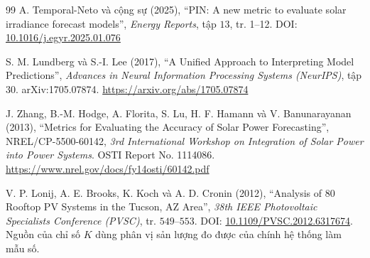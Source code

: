 \begin{thebibliography}{99}
A. Temporal-Neto và cộng sự (2025),
``PIN: A new metric to evaluate solar irradiance forecast models'',
\textit{Energy Reports}, tập $13$, tr. 1--12.
DOI: \href{https://doi.org/10.1016/j.egyr.2025.01.076}{10.1016/j.egyr.2025.01.076}

S. M. Lundberg và S.-I. Lee (2017),
``A Unified Approach to Interpreting Model Predictions'',
\textit{Advances in Neural Information Processing Systems (NeurIPS)}, tập 30.
arXiv:1705.07874. \url{https://arxiv.org/abs/1705.07874}

J. Zhang, B.-M. Hodge, A. Florita, S. Lu, H. F. Hamann và V. Banunarayanan (2013),
``Metrics for Evaluating the Accuracy of Solar Power Forecasting'',
NREL/CP-5500-60142, \textit{3rd International Workshop on Integration of Solar Power into
Power Systems}. OSTI Report No. 1114086.
\url{https://www.nrel.gov/docs/fy14osti/60142.pdf}

V. P. Lonij, A. E. Brooks, K. Koch và A. D. Cronin (2012),
``Analysis of 80 Rooftop PV Systems in the Tucson, AZ Area'',
\textit{38th IEEE Photovoltaic Specialists Conference (PVSC)}, tr. $549$--$553$.
DOI: \href{https://doi.org/10.1109/PVSC.2012.6317674}{10.1109/PVSC.2012.6317674}.
Nguồn của chỉ số $K$ dùng phân vị sản lượng đo được của chính hệ thống làm mẫu số.

\end{thebibliography}
